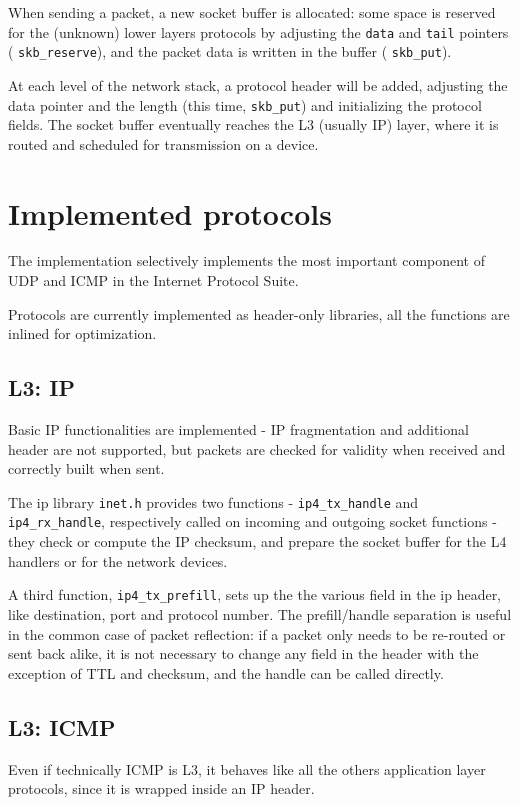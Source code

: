 \documentclass[a4paper,twoside,openright]{report}
\renewcommand{\t}[1]{%
	{\texttt{#1}}}
\begin{document}
When sending a packet, a new socket buffer is allocated: some space is reserved for the (unknown) lower layers protocols by adjusting the \texttt{data} and  \texttt{tail} pointers (\t{skb\_reserve}), and the packet data is written in the buffer (\t{skb\_put}).

At each level of the network stack, a protocol header will be added, adjusting the data pointer and the length (this time, \t{skb\_put}) and initializing the protocol fields. The socket buffer eventually reaches the L3 (usually IP) layer, where it is routed and scheduled for transmission on a device.

\section{Implemented protocols}
The implementation selectively implements the most important component of UDP and ICMP in the Internet Protocol Suite.

Protocols are currently implemented as header-only libraries, all the functions are inlined for optimization.

\subsection{L3: IP}
Basic IP functionalities are implemented - IP fragmentation and additional header are not supported, but packets are checked for validity when received and correctly built when sent.

The ip library \t{inet.h} provides two functions - \t{ip4\_tx\_handle} and \t{ip4\_rx\_handle}, respectively called on incoming and outgoing socket functions - they check or compute the IP checksum, and prepare the socket buffer for the L4 handlers or for the network devices.

A third function, \t{ip4\_tx\_prefill}, sets up the the various field in the ip header, like destination, port and protocol number. The prefill/handle separation is useful in the common case of packet reflection: if a packet only needs to be re-routed or sent back alike, it is not necessary to change any field in the header with the exception of TTL and checksum, and the handle can be called directly.

\subsection{L3: ICMP}
Even if technically ICMP is L3, it behaves like all the others application layer protocols, since it is wrapped inside an IP header.
\end{document}
